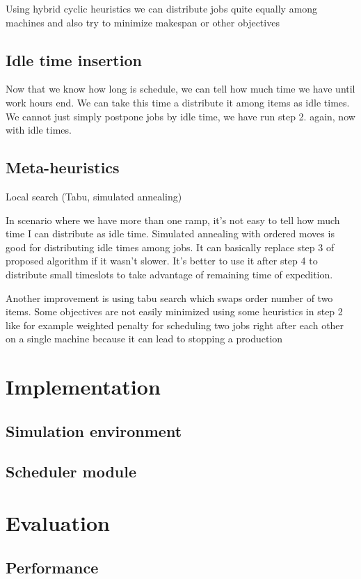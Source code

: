 \documentclass{ctuthesis}
\begin{document}
Using hybrid cyclic heuristics we can distribute jobs quite equally among machines and also try to minimize makespan or other objectives

\section{Idle time insertion}

Now that we know how long is schedule, we can tell how much time we have until work hours end. We can take this time a distribute it among items as idle times. We cannot just simply postpone jobs by idle time, we have run step 2. again, now with idle times.

\section{Meta-heuristics}
Local search (Tabu, simulated annealing)

In scenario where we have more than one ramp, it's not easy to tell how much time I can distribute as idle time. Simulated annealing with ordered moves is good for distributing idle times among jobs. It can basically replace step 3 of proposed algorithm if it wasn't slower. It's better to use it after step 4 to distribute small timeslots to take advantage of remaining time of expedition.

Another improvement is using tabu search which swaps order number of two items. Some objectives are not easily minimized using some heuristics in step 2 like for example weighted penalty for scheduling two jobs right after each other on a single machine because it can lead to stopping a production

\chapter{Implementation}
\section{Simulation environment}
\section{Scheduler module}
\chapter{Evaluation}
\label{ch:Evaluation}
\section{Performance}
\end{document}
